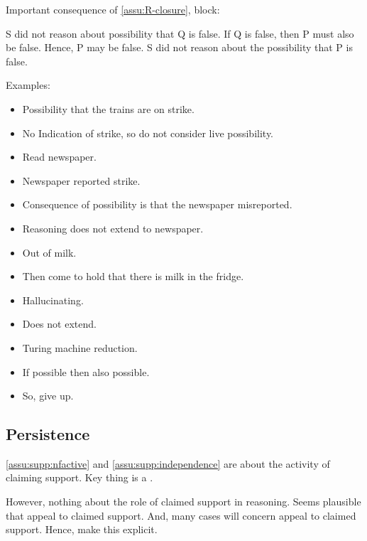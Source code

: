 \begin{note}
  Important consequence of \autoref{assu:R-closure}, block:

  S did not reason about possibility that Q is false.
  If Q is false, then P must also be false.
  Hence, P may be false.
  S did not reason about the possibility that P is false.

  \begin{note}
  Examples:
  \begin{itemize}
  \item Possibility that the trains are on strike.
  \item No Indication of strike, so do not consider live possibility.
  \item Read newspaper.
  \item Newspaper reported strike.
  \item Consequence of possibility is that the newspaper misreported.
  \item Reasoning does not extend to newspaper.
  \end{itemize}

  \begin{itemize}
  \item Out of milk.
  \item Then come to hold that there is milk in the fridge.
  \item Hallucinating.
  \item Does not extend.
  \end{itemize}

  \begin{itemize}
  \item Turing machine reduction.
  \item If possible then also possible.
  \item So, give up.
  \end{itemize}
\end{note}
\end{note}


\subsection{Persistence}
\label{sec:persistence}

\begin{note}
  \autoref{assu:supp:nfactive} and \autoref{assu:supp:independence} are about the activity of claiming support.
  Key thing is a \requ{}.

  However, nothing about the role of claimed support in reasoning.
  Seems plausible that appeal to claimed support.
  And, many cases will concern appeal to claimed support.
  Hence, make this explicit.
\end{note}

